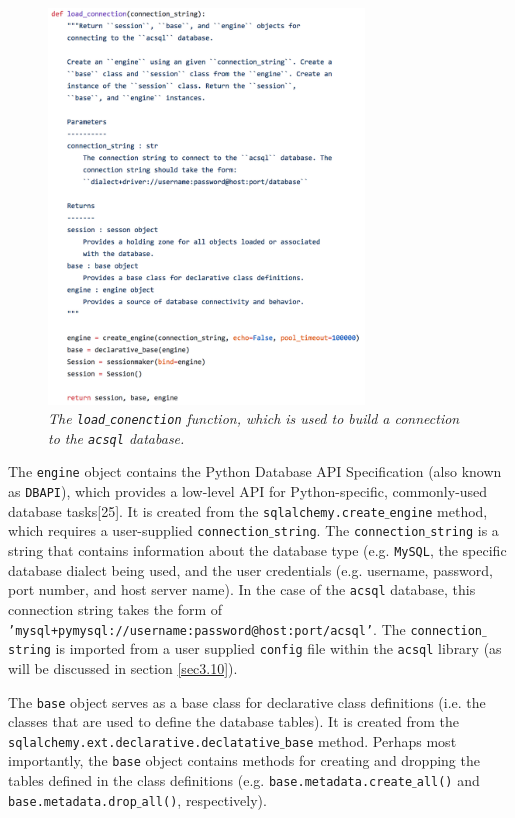 \documentclass[10pt,journal,compsoc]{IEEEtran}
\begin{document}
\begin{figure}[!h]
\centering
\includegraphics[width=3.3in]{./figures/load_connection.png}
\caption{\textit{The \texttt{load$\_$conenction} function, which is used to build a connection to the \texttt{acsql} database.}}
\label{fig12}
\end{figure}

The \texttt{engine} object contains the Python Database API Specification (also known as \texttt{DBAPI}), which provides a low-level API for Python-specific, commonly-used
database tasks[25].  It is created from the \texttt{sqlalchemy.create$\_$engine} method, which requires a user-supplied \texttt{connection$\_$string}.  The \texttt{connection$\_$string}
is a string that contains information about the database type (e.g. \texttt{MySQL}, the specific database dialect being used, and the user credentials (e.g. username, password, port number,
and host server name).  In the case of the \texttt{acsql} database, this connection string takes the form of \texttt{'mysql+pymysql://username:password@host:port/acsql'}.
The \texttt{connection$\_$string} is imported from a user supplied \texttt{config} file within the \texttt{acsql} library (as will be discussed in section \ref{sec3.10}).

The \texttt{base} object serves as a base class for declarative class definitions (i.e. the classes that are used to define the database tables).  It is created from the
\texttt{sqlalchemy.ext.declarative.declatative$\_$base} method.  Perhaps most importantly, the \texttt{base} object contains methods for creating and dropping the tables defined in
the class definitions (e.g. \texttt{base.metadata.create$\_$all()} and \texttt{base.metadata.drop$\_$all()}, respectively).
\end{document}
